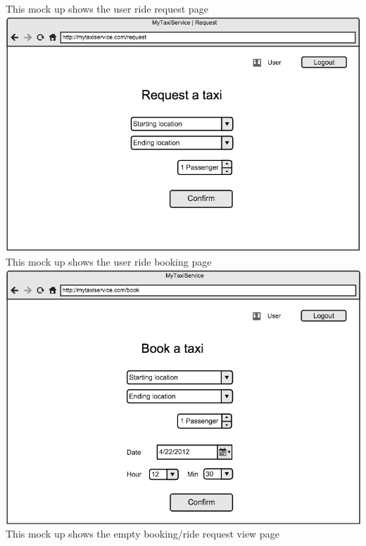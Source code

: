 \documentclass[11pt]{article} %
\begin{document}
        \newpage
        \noindent
        This mock up shows the user ride request page\newline
        \newline
        \includegraphics[scale=0.52]{taxiReqInt.png}\newline
        \newpage
        \noindent
        This mock up shows the user ride booking page\newline
       \newline
        \includegraphics[scale=0.52]{taxiBookInt.png}\newline
        \newpage
        \noindent
        This mock up shows the empty booking/ride request view page\newline
        \newline
\end{document}
